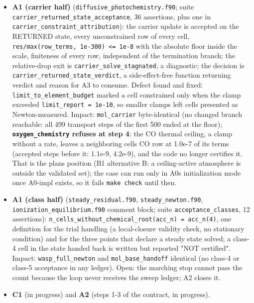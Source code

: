 \documentclass[english,a4paper]{my_memo}
\begin{document}
\begin{itemize}
\item
  \textbf{A1 (carrier half)} (\texttt{diffusive\_photochemistry.f90}; suite
  \texttt{carrier\_returned\_state\_acceptance}, 36 assertions, plus one in
  \texttt{carrier\_constraint\_attribution}): the carrier update is accepted on the
  RETURNED state, every unconstrained row of every cell,
  \texttt{\textbar{}res\textbar{}/max(row\_terms,\ 1e-300)\ \textless{}=\ 1e-8} with the absolute floor inside the
  scale, finiteness of every row, independent of the termination branch;
  the relative-drop exit is \texttt{carrier\_solve\_stagnated}, a diagnostic; the
  decision is \texttt{carrier\_returned\_state\_verdict}, a side-effect-free function
  returning verdict and reason for A3 to consume. Defect found and fixed:
  \texttt{limit\_to\_element\_budget} marked a cell constrained only when the clamp
  exceeded \texttt{limit\_report\ =\ 1e-10}, so smaller clamps left cells presented as
  Newton-measured. Impact: \texttt{mol\_carrier} byte-identical (no changed branch
  reachable: all 499 transport steps of the first 500 ended at the floor);
  \textbf{\texttt{oxygen\_chemistry} refuses at step 4}: the CO thermal ceiling, a clamp
  without a rate, leaves a neighboring cell\textquotesingle s CO row at 1.0e-7 of its terms
  (accepted steps before it: 1.1e-9, 4.2e-9), and the code no longer
  certifies it. That is the plan\textquotesingle s position (B1 alternative B: a
  ceiling-active atmosphere is outside the validated set); the case can run
  only in A0\textquotesingle s initialization mode once A0-impl exists, so it fails
  \texttt{make\ check} until then.
\item
  \textbf{A1 (class half)} (\texttt{steady\_residual.f90}, \texttt{steady\_newton.f90},
  \texttt{ionization\_equilibrium.f90} comment block; suite \texttt{acceptance\_classes},
  12 assertions): \texttt{n\_cells\_without\_chemical\_root(acc\_n)\ =\ acc\_n(4)}, one
  definition for the trial handling (a local-closure validity check, no
  stationary condition) and for the three points that declare a steady
  state solved; a class-4 cell in the state handed back is written but
  reported "NOT certified". Impact: \texttt{wasp\_full\_newton} and
  \texttt{mol\_base\_handoff} identical (no class-4 or class-5 acceptance in any
  ledger). Open: the marching stop cannot pass the count because the loop
  never receives the sweep ledger; A2 closes it.
\item
  \textbf{C1} (in progress) and \textbf{A2} (steps 1-3 of the contract, in progress).

\end{itemize}
\end{document}
